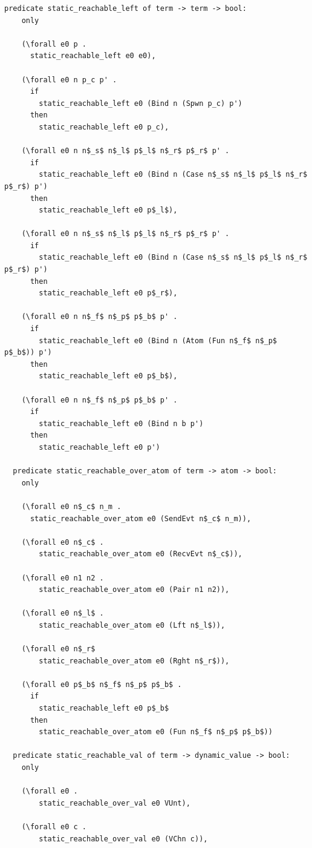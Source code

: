 \documentclass[10pt]{article}
\begin{document}
\begin{lstlisting}[language=logic, mathescape]
  predicate static_reachable_left of term -> term -> bool:
    only

    (\forall e0 p .
      static_reachable_left e0 e0),

    (\forall e0 n p_c p' .
      if 
        static_reachable_left e0 (Bind n (Spwn p_c) p')
      then
        static_reachable_left e0 p_c),

    (\forall e0 n n$_s$ n$_l$ p$_l$ n$_r$ p$_r$ p' .
      if
        static_reachable_left e0 (Bind n (Case n$_s$ n$_l$ p$_l$ n$_r$ p$_r$) p')
      then
        static_reachable_left e0 p$_l$),

    (\forall e0 n n$_s$ n$_l$ p$_l$ n$_r$ p$_r$ p' .
      if
        static_reachable_left e0 (Bind n (Case n$_s$ n$_l$ p$_l$ n$_r$ p$_r$) p')
      then
        static_reachable_left e0 p$_r$),

    (\forall e0 n n$_f$ n$_p$ p$_b$ p' .
      if
        static_reachable_left e0 (Bind n (Atom (Fun n$_f$ n$_p$ p$_b$)) p')
      then
        static_reachable_left e0 p$_b$),

    (\forall e0 n n$_f$ n$_p$ p$_b$ p' .
      if
        static_reachable_left e0 (Bind n b p')
      then
        static_reachable_left e0 p')

  predicate static_reachable_over_atom of term -> atom -> bool:
    only

    (\forall e0 n$_c$ n_m .
      static_reachable_over_atom e0 (SendEvt n$_c$ n_m)),

    (\forall e0 n$_c$ .
        static_reachable_over_atom e0 (RecvEvt n$_c$)),

    (\forall e0 n1 n2 .
        static_reachable_over_atom e0 (Pair n1 n2)),

    (\forall e0 n$_l$ .
        static_reachable_over_atom e0 (Lft n$_l$)),

    (\forall e0 n$_r$
        static_reachable_over_atom e0 (Rght n$_r$)),

    (\forall e0 p$_b$ n$_f$ n$_p$ p$_b$ . 
      if
        static_reachable_left e0 p$_b$ 
      then
        static_reachable_over_atom e0 (Fun n$_f$ n$_p$ p$_b$))

  predicate static_reachable_val of term -> dynamic_value -> bool:
    only

    (\forall e0 .
        static_reachable_over_val e0 VUnt),

    (\forall e0 c .
        static_reachable_over_val e0 (VChn c)),


\end{lstlisting}
\end{document}
